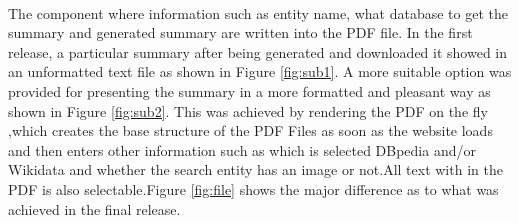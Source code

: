 \documentclass[head,11pt]{llncs}
\begin{document}
\paragraph{}
The component where information such as entity name, what database to get the summary and generated summary are written into the PDF file.
In the first release, a particular summary after being generated and downloaded it showed in an unformatted text file as shown in Figure \ref{fig:sub1}. A more suitable option was provided for presenting the summary in a more formatted and pleasant way as shown in Figure \ref{fig:sub2}. This was achieved by rendering the PDF on the fly ,which creates the base structure of the PDF Files as soon as the website loads and then enters other information such as which is selected DBpedia and/or Wikidata and whether the search entity has an image or not.All text with in the PDF is also selectable.Figure \ref{fig:file} shows the major difference as to what was achieved in the final release. 
\end{document}
